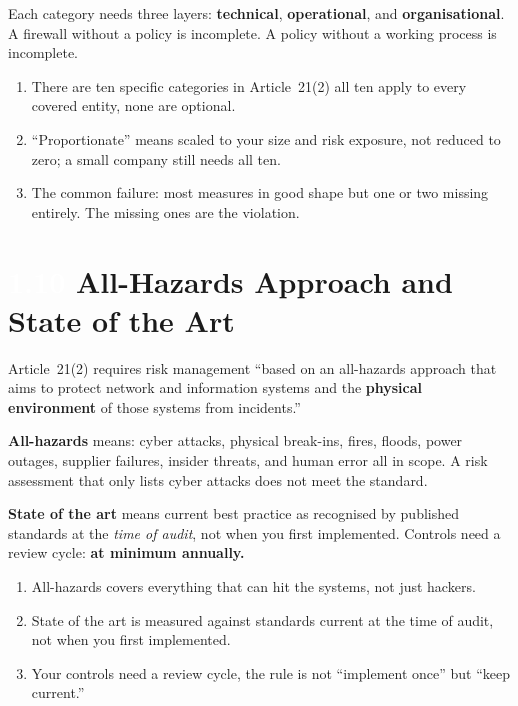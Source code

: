 \documentclass[11pt,a4paper,twoside]{book}
\newcommand{\lessontag}[1]{%
  \texorpdfstring{%
    \setlength{\fboxsep}{3pt}\colorbox{nisd2blue}{\textcolor{white}{\footnotesize\bfseries #1}}\quad%
  }{Lesson #1\ }%
}
\begin{document}
Each category needs three layers: \textbf{technical}, \textbf{operational}, and \textbf{organisational}. A firewall without a policy is incomplete. A policy without a working process is incomplete.

\begin{keytakeaways}
\begin{enumerate}
  \item There are ten specific categories in Article~21(2) all ten apply to every covered entity, none are optional.
  \item ``Proportionate'' means scaled to your size and risk exposure, not reduced to zero; a small company still needs all ten.
  \item The common failure: most measures in good shape but one or two missing entirely. The missing ones are the violation.
\end{enumerate}
\end{keytakeaways}

\section{\lessontag{1.10}All-Hazards Approach and State of the Art}

Article~21(2) requires risk management ``based on an all-hazards approach that aims to protect network and information systems and the \textbf{physical environment} of those systems from incidents.''

\textbf{All-hazards} means: cyber attacks, physical break-ins, fires, floods, power outages, supplier failures, insider threats, and human error  all in scope. A risk assessment that only lists cyber attacks does not meet the standard.

\textbf{State of the art} means current best practice as recognised by published standards at the \emph{time of audit}, not when you first implemented. Controls need a review cycle: \textbf{at minimum annually.}

\begin{keytakeaways}
\begin{enumerate}
  \item All-hazards covers everything that can hit the systems, not just hackers.
  \item State of the art is measured against standards current at the time of audit, not when you first implemented.
  \item Your controls need a review cycle, the rule is not ``implement once'' but ``keep current.''
\end{enumerate}
\end{keytakeaways}
\end{document}

